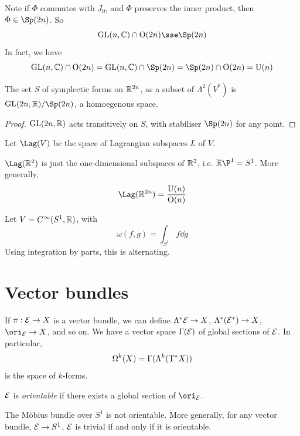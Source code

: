 \documentclass{article}
\begin{document}
Note if \(\Phi\) commutes with \(J_0\), and \(\Phi\) preserves the inner product, then \(\Phi \in \Sp(2n)\). So
\[\GL(n, \C) \cap \mathrm O(2n) \sse \Sp(2n)\]
In fact, we have
\[\GL(n, \C) \cap \mathrm O(2n) = \GL(n, \C) \cap \Sp(2n) = \Sp(2n) \cap \mathrm O(2n) = \mathrm U(n)\]

\begin{proposition}
    The set \(S\) of symplectic forms on \(\mathbb{R}^{2n}\), as a subset of \(\Lambda^2(V^*)\) is \(\GL(2n, \R)/\Sp(2n)\), a homoegenous space.
\end{proposition}

\begin{proof}
    \(\operatorname{GL}(2n, \mathbb{R})\) acts transitively on \(S\), with stabiliser \(\Sp(2n)\) for any point.
\end{proof}

Let \(\Lag(V)\) be the space of Lagrangian subspaces \(L\) of \(V\).

\begin{example}
    \(\Lag(\R^2)\) is just the one-dimensional subspaces of \(\mathbb{R}^2\), i.e. \(\R\P^1 = S^1\). More generally,
    \[\Lag(\R^{2n}) = \frac{\mathrm U(n)}{\mathrm O(n)}\]
\end{example}

\begin{example}
    Let \(V = C^\infty(S^1, \mathbb{R})\), with
    \[\omega(f, g) = \int_{S^1}f\dd g\]
    Using integration by parts, this is alternating.
\end{example}

\section{Vector bundles}

If \(\pi : \mathcal{E} \to X\) is a vector bundle, we can define \(\Lambda^*\mathcal{E} \to X\), \(\Lambda^*(\mathcal{E}^*) \to X\), \(\ori_\mcE \to X\), and so on. We have a vector space \(\Gamma(\mathcal{E})\) of global sections of \(\mathcal{E}\). In particular,
\[\Omega^k(X) = \Gamma(\Lambda^k(\mathrm{T}^* X))\]
is the space of \(k\)-forms.

\lec

\begin{definition}
    \(\mathcal{E}\) is \emph{orientable} if there exists a global section of \(\ori_\mcE\).
\end{definition}

\begin{example}
     The M\"obius bundle over \(S^1\) is not orientable. More generally, for any vector bundle, \(\mathcal{E} \to S^1\), \(\mathcal{E}\) is trivial if and only if it is orientable.
\end{example}
\end{document}
